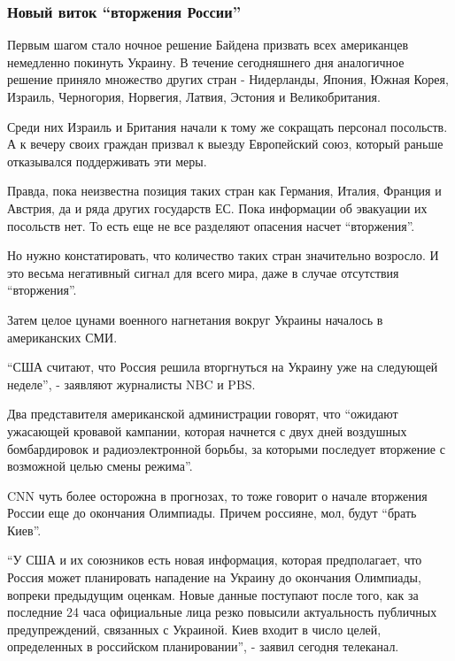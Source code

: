  
 
 
 
 

\subsubsection{Новый виток \enquote{вторжения России}}

Первым шагом стало ночное решение Байдена призвать всех американцев немедленно
покинуть Украину. В течение сегодняшнего дня аналогичное решение приняло
множество других стран -  Нидерланды, Япония, Южная Корея, Израиль, Черногория,
Норвегия, Латвия, Эстония и Великобритания.

Среди них Израиль и Британия начали к тому же сокращать персонал посольств. А к
вечеру своих граждан призвал к выезду Европейский союз, который раньше
отказывался поддерживать эти меры.

Правда, пока неизвестна позиция таких стран как Германия, Италия, Франция и
Австрия, да и ряда других государств ЕС. Пока информации об эвакуации их
посольств нет. То есть еще не все разделяют опасения насчет \enquote{вторжения}.

Но нужно констатировать, что количество таких стран значительно возросло. И это
весьма негативный сигнал для всего мира, даже в случае отсутствия \enquote{вторжения}. 

Затем целое цунами военного нагнетания вокруг Украины началось в американских
СМИ.

\enquote{США считают, что Россия решила вторгнуться на Украину уже на следующей
неделе}, - заявляют журналисты NBC и PBS.

Два представителя американской администрации говорят, что \enquote{ожидают ужасающей
кровавой кампании, которая начнется с двух дней воздушных бомбардировок и
радиоэлектронной борьбы, за которыми последует вторжение с возможной целью
смены режима}.

CNN чуть более осторожна в прогнозах, то тоже говорит о начале вторжения России
еще до окончания Олимпиады. Причем россияне, мол, будут \enquote{брать Киев}. 

\enquote{У США и их союзников есть новая информация, которая предполагает, что Россия
может планировать нападение на Украину до окончания Олимпиады, вопреки
предыдущим оценкам. Новые данные поступают после того, как за последние 24 часа
официальные лица резко повысили актуальность публичных предупреждений,
связанных с Украиной. Киев входит в число целей, определенных в российском
планировании}, - заявил сегодня телеканал.

